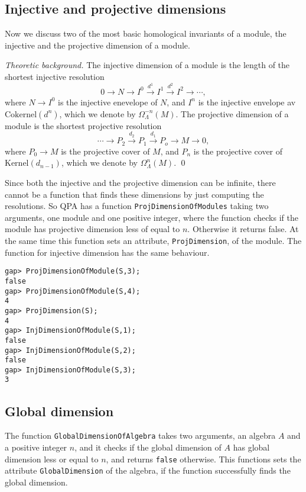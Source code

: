 \documentclass{amsart}
\theoremstyle{definition}
\newcommand{\code}[1]{\texttt{#1}}
\theoremstyle{theoretic}
\newenvironment{theoback}
{\medskip\small\textit{Theoretic background.} }
{\qed\par\medskip}
\begin{document}
\subsection{Injective and projective dimensions}
Now we discuss two of the most basic homological invariants of a
module, the injective and the projective dimension of a module. 

\begin{theoback}
The injective dimension of a module is the length of the shortest injective
resolution
\[0\to N\to I^0\xrightarrow{d^1} I^1\xrightarrow{d^2} I^2\to \cdots, \]
where $N\to I^0$ is the injective enevelope of $N$, and $I^{n}$ is the
injective envelope av $\textrm{Cokernel}(d^n)$, which we denote by
$\Omega^{-n}_\Lambda(M)$.  The projective dimension of a module is the
shortest projective resolution
\[
\cdots \to P_2\xrightarrow{d_2} P_1\xrightarrow{d_1} P_o\to M\to 0,
\]
where $P_0\to M$ is the projective cover of $M$, and $P_n$ is the
projective cover of $\textrm{Kernel}(d_{n-1})$, which we denote by
$\Omega^n_\Lambda(M)$. 
\end{theoback}
Since both the injective and the projective dimension can be infinite,
there cannot be a function that finds these dimensions by just
computing the resolutions.  So QPA has a function
\code{ProjDimensionOfModules} taking two arguments, one module and one
positive integer, where the function checks if the module has
projective dimension less of equal to $n$.  Otherwise it returns
false. At the same time this function sets an attribute,
\code{ProjDimension}, of the module.  The function for injective
dimension has the same behaviour. 

\begin{verbatim}
gap> ProjDimensionOfModule(S,3);
false
gap> ProjDimensionOfModule(S,4);
4
gap> ProjDimension(S);
4
gap> InjDimensionOfModule(S,1); 
false
gap> InjDimensionOfModule(S,2);
false
gap> InjDimensionOfModule(S,3);
3
\end{verbatim}

\subsection{Global dimension}
The function \code{GlobalDimensionOfAlgebra} takes two arguments, an
algebra $A$ and a positive integer $n$, and it checks if the global
dimension of $A$ has global dimension less or equal to $n$, and
returns \code{false} otherwise.  This functions sets the attribute
\code{GlobalDimension} of the algebra, if the function successfully
finds the global dimension. 
\end{document}
